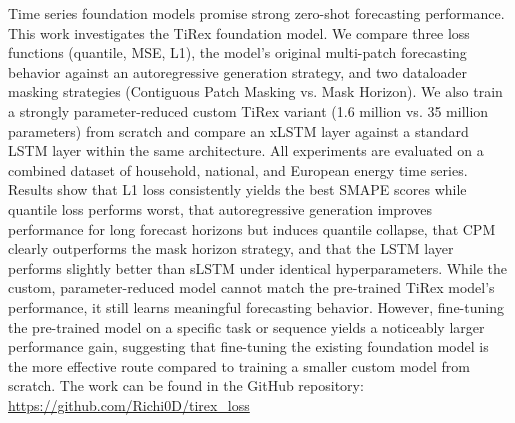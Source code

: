 \documentclass[a4paper,oneside,10pt,ngerman,english]{scrartcl}
\begin{document}


\maketitle


\cleardoubleoddpage
\tableofcontents




\cleardoubleoddpage


Time series foundation models promise strong zero-shot forecasting performance. This work investigates the TiRex foundation model. We compare three loss functions (quantile, MSE, L1), the model's original multi-patch forecasting behavior against an autoregressive generation strategy, and two dataloader masking strategies (Contiguous Patch Masking vs. Mask Horizon). We also train a strongly parameter-reduced custom TiRex variant (1.6 million vs. 35 million parameters) from scratch and compare an xLSTM layer against a standard LSTM layer within the same architecture. All experiments are evaluated on a combined dataset of household, national, and European energy time series. Results show that L1 loss consistently yields the best SMAPE scores while quantile loss performs worst, that autoregressive generation improves performance for long forecast horizons but induces quantile collapse, that CPM clearly outperforms the mask horizon strategy, and that the LSTM layer performs slightly better than sLSTM under identical hyperparameters. While the custom, parameter-reduced model cannot match the pre-trained TiRex model's performance, it still learns meaningful forecasting behavior. However, fine-tuning the pre-trained model on a specific task or sequence yields a noticeably larger performance gain, suggesting that fine-tuning the existing foundation model is the more effective route compared to training a smaller custom model from scratch. The work can be found in the GitHub repository:  \url{https://github.com/Richi0D/tirex_loss}
\end{document}
